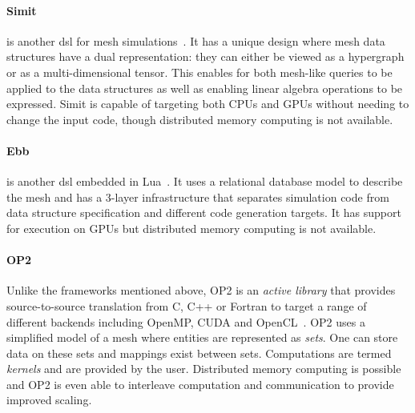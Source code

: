 \documentclass[thesis]{subfiles}
\begin{document}
\paragraph{Simit}{
  is another \gls{dsl} for mesh simulations~\cite{kjolstadSimitLanguagePhysical2016}.
  It has a unique design where mesh data structures have a dual representation: they can either be viewed as a hypergraph or as a multi-dimensional tensor.
  This enables for both mesh-like queries to be applied to the data structures as well as enabling linear algebra operations to be expressed.
  Simit is capable of targeting both CPUs and GPUs without needing to change the input code, though distributed memory computing is not available.
}

\paragraph{Ebb}{
  is another \gls{dsl} embedded in Lua~\cite{bernsteinEbbDSLPhysical2016}.
  It uses a relational database model to describe the mesh and has a 3-layer infrastructure that separates simulation code from data structure specification and different code generation targets.
  It has support for execution on GPUs but distributed memory computing is not available.
}

\paragraph{OP2}{
  Unlike the frameworks mentioned above, OP2 is an \textit{active library} that provides source-to-source translation from C, C++ or Fortran to target a range of different backends including OpenMP, CUDA and OpenCL~\cite{mudaligeOP2ActiveLibrary2012}.
  OP2 uses a simplified model of a mesh where entities are represented as \textit{sets}.
  One can store data on these sets and mappings exist between sets.
  Computations are termed \textit{kernels} and are provided by the user.
  Distributed memory computing is possible and OP2 is even able to interleave computation and communication to provide improved scaling.
}
\end{document}
